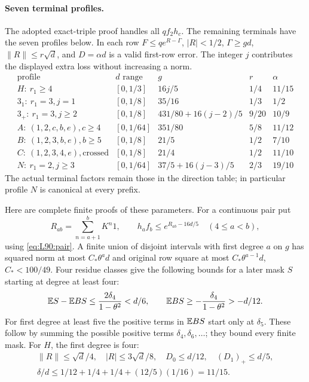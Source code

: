 \paragraph{Seven terminal profiles.}
\label{part:r40:remaining-profiles}
The adopted exact-triple proof handles all \(qf_2h_c\).
The remaining terminals have the seven profiles below. In each row
\(F\le qe^{R-\Gamma}\), \(|R|<1/2\), \(\Gamma\ge gd\),
\(\|R\|\le r\sqrt d\), and \(D=\alpha d\) is a valid first-row error.
The integer \(j\) contributes the displayed extra loss without
increasing a norm.
\[
\begin{array}{c|c|c|c|c}
 \text{profile}&d\text{ range}&g&r&\alpha\\ \hline
 H:\ r_1\ge4&[0,1/3]&16j/5&1/4&11/15\\
 3_1:\ r_1=3,j=1&[0,1/8]&35/16&1/3&1/2\\
 3_+:\ r_1=3,j\ge2&[0,1/8]&431/80+16(j-2)/5&9/20&10/9\\
 A:\ (1,2,c,b,e),c\ge4&[0,1/64]&351/80&5/8&11/12\\
 B:\ (1,2,3,b,e),b\ge5&[0,1/8]&21/5&1/2&7/10\\
 C:\ (1,2,3,4,e),\text{crossed}&[0,1/8]&21/4&1/2&11/10\\
 N:\ r_1=2,j\ge3&[0,1/64]&37/5+16(j-3)/5&2/3&19/10
\end{array}
\]
The actual terminal factors remain those in the direction table;
in particular profile \(N\) is canonical at every prefix.

Here are complete finite proofs of these parameters.
For a continuous pair put
\[
 R_{ab}=\sum_{n=a+1}^{b}K^n1,\qquad
 h_af_b\le e^{R_{ab}-16d/5}\quad(4\le a<b),
\]
using \eqref{eq:L90:pair}. A finite union of disjoint intervals with
first degree \(a\) on \(g\) has squared norm at most
\(C_*\theta^a d\) and original row square at most
\(C_*\theta^{a-1}d\), \(C_*<100/49\).
Four residue classes give the following bounds for a later mask \(S\)
starting at degree at least four:
\begin{equation}\label{eq:r40:remaining-mask-means}
 \mathbb E S-\mathbb E BS\le\frac{2\delta_4}{1-\theta^2}<d/6,\qquad
 \mathbb E BS\ge-\frac{\delta_4}{1-\theta^2}>-d/12 .
\end{equation}
For first degree at least five the positive terms in \(\mathbb E BS\)
start only at \(\delta_5\).
These follow by summing the possible positive terms
\(\delta_4,\delta_6,\ldots\); they bound every finite mask.
For \(H\), the first degree is four:
\[
 \begin{gathered}
 \|R\|\le\sqrt d/4,\quad |R|\le3\sqrt d/8,\quad
 D_0\le d/12,\quad (D_1)_+\le d/5 ,\\
 \delta/d\le1/12+1/4+1/4+(12/5)(1/16)=11/15 .
 \end{gathered}
\]

